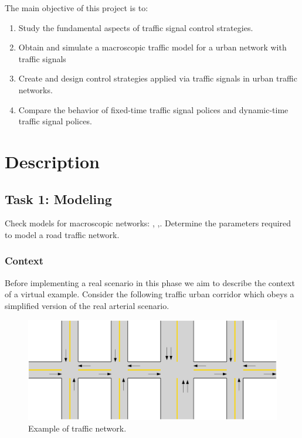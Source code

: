 \documentclass[]{book}
\providecommand{\tightlist}{%
  \setlength{\itemsep}{0pt}\setlength{\parskip}{0pt}}
\theoremstyle{definition}
\theoremstyle{definition}
\theoremstyle{definition}
\theoremstyle{remark}
\begin{document}
The main objective of this project is to:

\begin{enumerate}
\def\labelenumi{\arabic{enumi}.}
\tightlist
\item
  Study the fundamental aspects of traffic signal control strategies.
\item
  Obtain and simulate a macroscopic traffic model for a urban network
  with traffic signals
\item
  Create and design control strategies applied via traffic signals in
  urban traffic networks.
\item
  Compare the behavior of fixed-time traffic signal polices and
  dynamic-time traffic signal polices.
\end{enumerate}

\hypertarget{description}{%
\section*{Description}\label{description}}

\hypertarget{task-1-modeling}{%
\subsection*{Task 1: Modeling}\label{task-1-modeling}}

Check models for macroscopic networks: \autocite{Grandinetti2015},
\autocite{Grandinetti2016},\autocite{Varaiya2013:TR-C}. Determine the
parameters required to model a road traffic network.

\hypertarget{context-1}{%
\subsubsection*{Context}\label{context-1}}

Before implementing a real scenario in this phase we aim to describe the
context of a virtual example. Consider the following traffic urban
corridor which obeys a simplified version of the real arterial scenario.



\begin{figure}

{\centering \includegraphics{images/p1-01-network} 

}

\caption{Example of traffic network.}\label{fig:city}
\end{figure}
\end{document}

